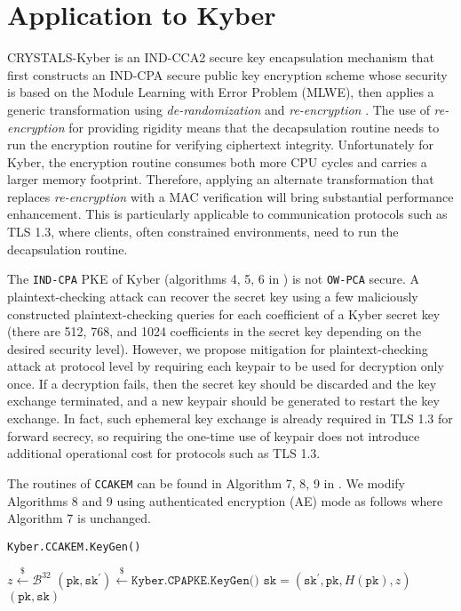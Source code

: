 \documentclass[floatrow,journal=tches,submission]{iacrtrans}
\newcommand{\pk}{\texttt{pk}}
\newcommand{\sk}{\texttt{sk}}
\newcommand{\leftsample}{\stackrel{\$}{\leftarrow}}
\begin{document}
% 

\section{Application to Kyber}
CRYSTALS-Kyber \cite{bos2018crystals}\cite{avanzi2019crystals} is an IND-CCA2 secure key encapsulation mechanism that first constructs an IND-CPA secure public key encryption scheme whose security is based on the Module Learning with Error Problem (MLWE), then applies a generic transformation using \emph{de-randomization} and \emph{re-encryption} \cite{hofheinz2017modular}. The use of \emph{re-encryption} for providing rigidity means that the decapsulation routine needs to run the encryption routine for verifying ciphertext integrity. Unfortunately for Kyber, the encryption routine consumes both more CPU cycles and carries a larger memory footprint. Therefore, applying an alternate transformation that replaces \emph{re-encryption} with a MAC verification will bring substantial performance enhancement. This is particularly applicable to communication protocols such as TLS 1.3, where clients, often constrained environments, need to run the decapsulation routine.

The \texttt{IND-CPA} PKE of Kyber (algorithms 4, 5, 6 in \cite{avanzi2019crystals}) is not \texttt{OW-PCA} secure. A plaintext-checking attack \cite{ravi2019generic} can recover the secret key using a few maliciously constructed plaintext-checking queries for each coefficient of a Kyber secret key (there are 512, 768, and 1024 coefficients in the secret key depending on the desired security level). However, we propose mitigation for plaintext-checking attack at protocol level by requiring each keypair to be used for decryption only once. If a decryption fails, then the secret key should be discarded and the key exchange terminated, and a new keypair should be generated to restart the key exchange. In fact, such ephemeral key exchange is already required in TLS 1.3 for forward secrecy, so requiring the one-time use of keypair does not introduce additional operational cost for protocols such as TLS 1.3.

The routines of \texttt{CCAKEM} can be found in Algorithm 7, 8, 9 in \cite{avanzi2019crystals}. We modify Algorithms 8 and 9 using authenticated encryption (AE)  mode as follows where Algorithm 7 is unchanged.

\begin{algorithm}[H]
    \caption{\texttt{Kyber.CCAKEM.KeyGen()}}\label{alg:kyber-ae-keygen}
    \begin{algorithmic}[1]
        \State $z \leftsample \mathcal{B}^{32}$
        \State $(\pk, \sk^\prime) \leftsample \texttt{Kyber.CPAPKE.KeyGen()}$
        \State $\sk = (\sk^\prime, \pk, H(\pk), z)$
        \State \Return $(\pk, \sk)$
    \end{algorithmic}
\end{algorithm}
\end{document}
